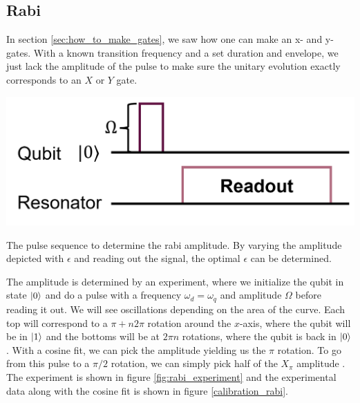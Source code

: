 \subsection{Rabi}
In section \ref{sec:how_to_make_gates}, we saw how one can make an x- and y-gates. With a known transition frequency and a set duration and envelope, we just lack the amplitude of the pulse to make sure the unitary evolution exactly corresponds to an $X$ or $Y$ gate. 
\begin{marginfigure}[5 cm]
    \centering
    \includegraphics[]{Figs/circuits/rabi.png}
    \caption{The pulse sequence to determine the rabi amplitude. By varying the amplitude depicted with $\epsilon$ and reading out the signal, the optimal $\epsilon$ can be determined.}
    \label{fig:rabi_experiment}
\end{marginfigure}
The amplitude is determined by an experiment, where we initialize the qubit in state $\ket{0}$ and do a pulse with a frequency $\omega_d = \omega_q$ and amplitude $\Omega$ before reading it out. We will see oscillations depending on the area of the curve. Each top will correspond to a $\pi +n2\pi$ rotation around the $x$-axis, where the qubit will be in $\ket{1}$ and the bottoms will be at $2\pi n$ rotations, where the qubit is back in $\ket{0}$. With a cosine fit, we can pick the amplitude yielding us the $\pi$ rotation. To go from this pulse to a $\pi/2$ rotation, we can simply pick half of the $X_{\pi}$ amplitude \cite{Rabi}. The experiment is shown in figure \ref{fig:rabi_experiment} and the experimental data along with the cosine fit is shown in figure \ref{calibration_rabi}.
